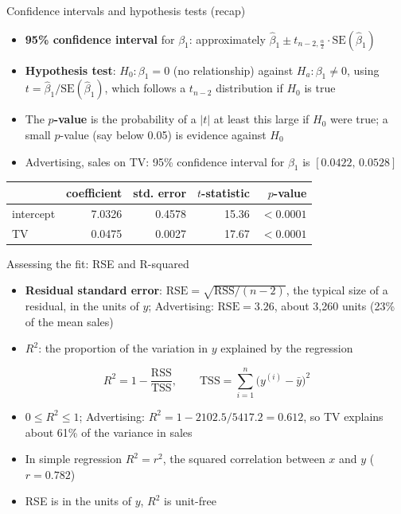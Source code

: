 \begin{frame}{Confidence intervals and hypothesis tests (recap)}
    \begin{itemize}
        \item \textbf{95\% confidence interval} for $\beta_1$: approximately $\hat\beta_1 \pm t_{n-2,\frac{\alpha}{2}} \cdot \mathrm{SE}(\hat\beta_1)$
        \item \textbf{Hypothesis test}: $H_0\colon \beta_1 = 0$ (no relationship) against $H_a\colon \beta_1 \neq 0$, using $t = \hat\beta_1 / \mathrm{SE}(\hat\beta_1)$, which follows a $t_{n-2}$ distribution if $H_0$ is true
        \item The \textbf{$p$-value} is the probability of a $|t|$ at least this large if $H_0$ were true; a small $p$-value (say below 0.05) is evidence against $H_0$
        \item Advertising, sales on TV: 95\% confidence interval for $\beta_1$ is $[0.0422,\, 0.0528]$
    \end{itemize}
    \begin{center}
        \small
        \begin{tabular}{lrrrr}
            \toprule
            & coefficient & std. error & $t$-statistic & $p$-value \\
            \midrule
            intercept & 7.0326 & 0.4578 & 15.36 & $<0.0001$ \\
            TV & 0.0475 & 0.0027 & 17.67 & $<0.0001$ \\
            \bottomrule
        \end{tabular}
    \end{center}
\end{frame}


\begin{frame}{Assessing the fit: RSE and R-squared}
    \begin{itemize}
        \item \textbf{Residual standard error}: $\mathrm{RSE} = \sqrt{\mathrm{RSS}/(n-2)}$, the typical size of a residual, in the units of $y$; Advertising: $\mathrm{RSE} = 3.26$, about 3,260 units (23\% of the mean sales)
        \item \textbf{$R^2$}: the proportion of the variation in $y$ explained by the regression
    \end{itemize}
    \[
        R^2 = 1 - \frac{\mathrm{RSS}}{\mathrm{TSS}}, \qquad \mathrm{TSS} = \sum_{i=1}^{n} \big(y^{(i)} - \bar{y}\big)^2
    \]
    \begin{itemize}
        \item $0 \le R^2 \le 1$; Advertising: $R^2 = 1 - 2102.5/5417.2 = 0.612$, so TV explains about 61\% of the variance in sales
        \item In simple regression $R^2 = r^2$, the squared correlation between $x$ and $y$ ($r = 0.782$)
        \item RSE is in the units of $y$, $R^2$ is unit-free
    \end{itemize}
\end{frame}


